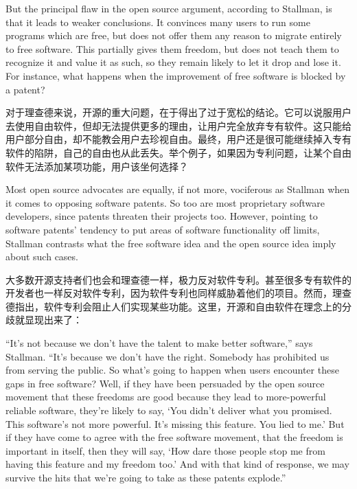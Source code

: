 \ifdefined\eng
But the principal flaw in the open source argument, according to Stallman, is that it leads to weaker conclusions.  It convinces many users to run some programs which are free, but does not offer them any reason to migrate entirely to free software.  This partially gives them freedom, but does not teach them to recognize it and value it as such, so they remain likely to let it drop and lose it.  For instance, what happens when the improvement of free software is blocked by a patent?
\fi

\ifdefined\chs
对于理查德来说，开源的重大问题，在于得出了过于宽松的结论。它可以说服用户去使用自由软件，但却无法提供更多的理由，让用户完全放弃专有软件。这只能给用户部分自由，却不能教会用户去珍视自由。最终，用户还是很可能继续掉入专有软件的陷阱，自己的自由也从此丢失。举个例子，如果因为专利问题，让某个自由软件无法添加某项功能，用户该坐何选择？
\fi

\ifdefined\eng
Most open source advocates are equally, if not more, vociferous as Stallman when it comes to opposing software patents.  So too are most proprietary software developers, since patents threaten their projects too.  However, pointing to software patents' tendency to put areas of software functionality off limits, Stallman contrasts what the free software idea and the open source idea imply about such cases.
\fi

\ifdefined\chs
大多数开源支持者们也会和理查德一样，极力反对软件专利。甚至很多专有软件的开发者也一样反对软件专利，因为软件专利也同样威胁着他们的项目。然而，理查德指出，软件专利会阻止人们实现某些功能。这里，开源和自由软件在理念上的分歧就显现出来了：
\fi

\ifdefined\eng
``It's not because we don't have the talent to make better software,'' says Stallman. ``It's because we don't have the right. Somebody has prohibited us from serving the public. So what's going to happen when users encounter these gaps in free software? Well, if they have been persuaded by the open source movement that these freedoms are good because they lead to more-powerful reliable software, they're likely to say, `You didn't deliver what you promised. This software's not more powerful. It's missing this feature. You lied to me.' But if they have come to agree with the free software movement, that the freedom is important in itself, then they will say, `How dare those people stop me from having this feature and my freedom too.' And with that kind of response, we may survive the hits that we're going to take as these patents explode.''
\fi

